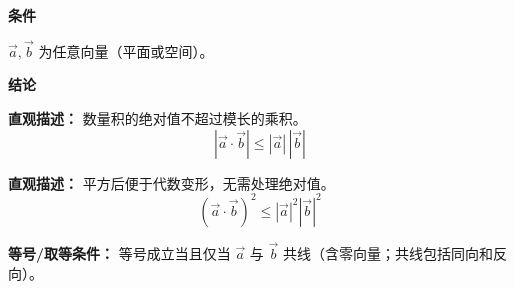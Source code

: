 \begin{statementbox}
	\textbf{\textcolor{CStatement}{条件}}

	\begin{description}[style=nextline, leftmargin=2.8em, labelsep=0.5em, itemsep=0.35em]
		\item[\textbf{\textcolor{CStatement}{条件 1（向量条件）：}}]
		      $\vec{a},\vec{b}$ 为任意向量（平面或空间）。
	\end{description}

	\textbf{\textcolor{CStatement}{结论}}

	\begin{description}[style=nextline, leftmargin=2.8em, labelsep=0.5em, itemsep=0.45em]
		\item[\textbf{\textcolor{CStatement}{结论一（绝对值不等式）：}}]
		      \textbf{\textcolor{CStatement}{直观描述：}}
		      数量积的绝对值不超过模长的乘积。
		      \[
			      |\vec{a}\cdot\vec{b}| \le |\vec{a}|\,|\vec{b}|
		      \]

		\item[\textbf{\textcolor{CStatement}{推广结论（平方形式）：}}]
		      \textbf{\textcolor{CStatement}{直观描述：}}
		      平方后便于代数变形，无需处理绝对值。
		      \[
			      (\vec{a}\cdot\vec{b})^2 \le |\vec{a}|^2|\vec{b}|^2
		      \]
	\end{description}

	\textbf{\textcolor{CStatement}{等号/取等条件：}} 等号成立当且仅当 $\vec{a}$ 与 $\vec{b}$ 共线（含零向量；共线包括同向和反向）。
\end{statementbox}